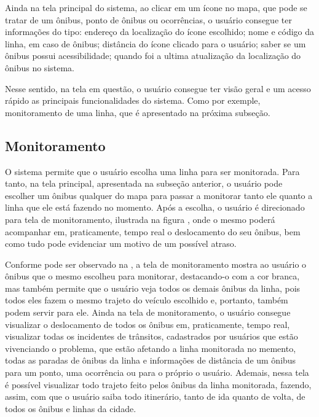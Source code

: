 Ainda na tela principal do sistema, ao clicar em um ícone no mapa, que pode se tratar de um  ônibus, ponto de ônibus ou ocorrências, o usuário consegue ter informações do tipo: endereço da localização do ícone escolhido; nome e código da linha, em caso de ônibus; distância do ícone clicado para o usuário; saber se um ônibus possui acessibilidade; quando foi a ultima atualização da localização do ônibus no sistema.
	
Nesse sentido, na tela em questão, o usuário consegue ter visão geral e um acesso rápido as principais funcionalidades do sistema. Como por exemple, monitoramento de uma linha, que é apresentado na próxima subseção.

\subsection{Monitoramento}

O sistema permite que o usuário escolha uma linha para ser monitorada. Para tanto, na tela principal, apresentada na subseção anterior, o usuário pode escolher um ônibus qualquer do mapa para passar a monitorar tanto ele quanto a linha que ele está fazendo no momento. Após a escolha, o usuário é direcionado para tela de monitoramento, ilustrada na figura , onde o mesmo poderá acompanhar em, praticamente, tempo real o deslocamento do seu ônibus, bem como tudo pode evidenciar um motivo de um possível atraso.
	
Conforme pode ser observado na , a tela de monitoramento mostra ao usuário o ônibus que o mesmo escolheu para monitorar, destacando-o com a cor branca, mas também permite que o usuário veja todos os demais ônibus da linha, pois todos eles fazem o mesmo trajeto do veículo escolhido e, portanto, também podem servir para ele. Ainda na tela de monitoramento, o usuário consegue visualizar o deslocamento de todos os ônibus em, praticamente, tempo real, visualizar  todas os incidentes de trânsitos, cadastrados por usuários que estão vivenciando o problema, que estão afetando a linha monitorada no memento, todas as paradas de ônibus da linha e informações de distância de um ônibus para um ponto, uma ocorrência ou para o próprio o usuário. Ademais,  nessa tela é possível visualizar todo trajeto feito pelos ônibus da linha monitorada, fazendo, assim, com que o usuário saiba todo itinerário, tanto de ida quanto de volta, de todos os ônibus e linhas da cidade. 
	
